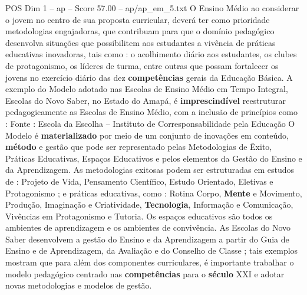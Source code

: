 \begin{textsample}{POS Dim 1 – ap – Score 57.00 – ap/ap\_em\_5.txt}
O Ensino Médio ao considerar o jovem no centro de sua proposta curricular, deverá ter como prioridade metodologias engajadoras, que contribuam para que o domínio pedagógico desenvolva situações que possibilitem aos estudantes a vivência de práticas educativas inovadoras, tais como : o acolhimento diário aos estudantes, os clubes de protagonismo, os líderes de turma, entre outras que possam fortalecer os jovens no exercício diário das dez \textbf{competências} gerais da Educação Básica.
A exemplo do Modelo adotado nas Escolas de Ensino Médio em Tempo Integral, Escolas do Novo Saber, no Estado do Amapá, é \textbf{imprescindível} reestruturar pedagogicamente as Escolas de Ensino Médio, com a inclusão de princípios como : Fonte : Escola da Escolha – Instituto de Corresponsabilidade pela Educação O Modelo é \textbf{materializado} por meio de um conjunto de inovações em conteúdo, \textbf{método} e gestão que pode ser representado pelas Metodologias de Êxito, Práticas Educativas, Espaços Educativos e pelos elementos da Gestão do Ensino e da Aprendizagem.
As metodologias exitosas podem ser estruturadas em estudos de : Projeto de Vida, Pensamento Científico, Estudo Orientado, Eletivas e Protagonismo ; e práticas educativas, como : Rotina Corpo, \textbf{Mente} e Movimento, Produção, Imaginação e Criatividade, \textbf{Tecnologia}, Informação e Comunicação, Vivências em Protagonismo e Tutoria.
Os espaços educativos são todos os ambientes de aprendizagem e os ambientes de convivência.
As Escolas do Novo Saber desenvolvem a gestão do Ensino e da Aprendizagem a partir do Guia de Ensino e de Aprendizagem, da Avaliação e do Conselho de Classe ; tais exemplos mostram que para além dos componentes curriculares, é importante trabalhar o modelo pedagógico centrado nas \textbf{competências} para o \textbf{século} XXI e adotar novas metodologias e modelos de gestão.

\end{textsample}
